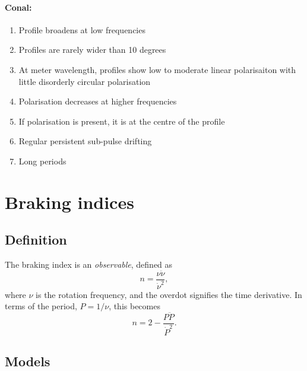 \documentclass{book}
\begin{document}
\paragraph{Conal:}
\begin{enumerate}
\item Profile broadens at low frequencies
\item Profiles are rarely wider than 10 degrees
\item At meter wavelength, profiles show low to moderate linear polarisaiton with little disorderly circular polarisation
\item Polarisation decreases at higher frequencies
\item If polarisation is present, it is at the centre of the profile
\item Regular persistent sub-pulse drifting
\item Long periods
\end{enumerate}


\section{Braking indices}

\subsection{Definition}

The braking index is an \emph{observable}, defined as
\begin{equation}
  n = \frac{\nu\ddot{\nu}}{\dot{\nu}^2},
\end{equation}
where $\nu$ is the rotation frequency, and the overdot signifies the time derivative.
In terms of the period, $P = 1/\nu$, this becomes
\begin{equation}
    n = 2 - \frac{P\ddot{P}}{\dot{P}^2}.
\end{equation}

\subsection{Models}
\end{document}
